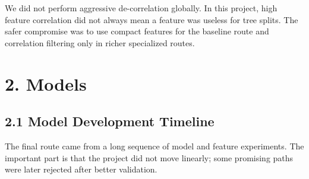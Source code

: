 \documentclass[11pt]{article}
\begin{document}
We did not perform aggressive de-correlation globally. In this project,
high feature correlation did not always mean a feature was useless for
tree splits. The safer compromise was to use compact features for the
baseline route and correlation filtering only in richer specialized
routes.

\section{2. Models}\label{models}

\subsection{2.1 Model Development
Timeline}\label{model-development-timeline}

The final route came from a long sequence of model and feature
experiments. The important part is that the project did not move
linearly; some promising paths were later rejected after better
validation.
\end{document}
